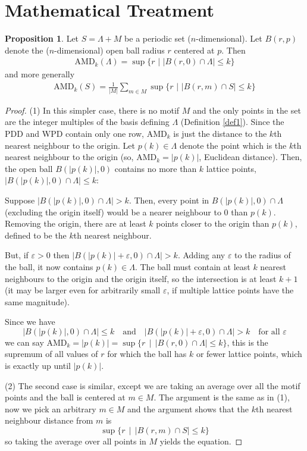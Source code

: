 \documentclass[11pt]{article}
\theoremstyle{definition}
\newtheorem{prop}{Proposition}
\begin{document}
\section{Mathematical Treatment}

\begin{prop}
Let $S=\Lambda+M$ be a periodic set ($n$-dimensional). Let $B(r,p)$ denote the ($n$-dimensional) open ball radius $r$ centered at $p$. Then
\begin{align}
\text{AMD}_k(\Lambda) = \sup \{r \,\,|\,\, |B(r,0) \cap \Lambda| \leq k\}
\end{align}
and more generally
\begin{align}
\text{AMD}_k(S) = \frac{1}{|M|}\sum_{m\in M}\sup \{r \,\,|\,\, |B(r,m) \cap S| \leq k\}
\end{align}
\end{prop}

\begin{proof}

(1) In this simpler case, there is no motif $M$ and the only points in the set are the integer multiples of the basis defining $\Lambda$ (Definition \ref{def1}). Since the PDD and WPD contain only one row, AMD$_k$ is just the distance to the $k$th nearest neighbour to the origin. Let $p(k)\in\Lambda$ denote the point which is the $k$th nearest neighbour to the origin (so, AMD$_k = |p(k)|$, Euclidean distance). Then, the open ball $B(|p(k)|,0)$ contains no more than $k$ lattice points, $|B(|p(k)|,0)\cap \Lambda|\leq k$:

Suppose $|B(|p(k)|,0)\cap \Lambda|>k$. Then, every point in $B(|p(k)|,0)\cap \Lambda$ (excluding the origin itself) would be a nearer neighbour to $0$ than $p(k)$. Removing the origin, there are at least $k$ points closer to the origin than $p(k)$, defined to be the $k$th nearest neighbour.

But, if $\varepsilon>0$ then $|B(|p(k)|+\varepsilon,0)\cap \Lambda| > k$. Adding any $\varepsilon$ to the radius of the ball, it now contains $p(k)\in\Lambda$. The ball must contain at least $k$ nearest neighbours to the origin and the origin itself, so the intersection is at least $k+1$ (it may be larger even for arbitrarily small $\varepsilon$, if multiple lattice points have the same magnitude).

Since we have
\[
|B(|p(k)|,0)\cap \Lambda|\leq k \quad \text{and} \quad |B(|p(k)|+\varepsilon,0)\cap \Lambda| > k \quad \text{for all $\varepsilon$}
\]
we can say AMD$_k = |p(k)| = \sup \{r \,\mid \, |B(r,0)\cap \Lambda| \leq k\}$, this is the supremum of all values of $r$ for which the ball has $k$ or fewer lattice points, which is exactly up until $|p(k)|$.

\null 

(2) The second case is similar, except we are taking an average over all the motif points and the ball is centered at $m\in M$. The argument is the same as in (1), now we pick an arbitrary $m\in M$ and the argument shows that the $k$th nearest neighbour distance from $m$ is 
\[
\sup \{r \,\mid \, |B(r,m)\cap S| \leq k\}
\]
so taking the average over all points in $M$ yields the equation.
\end{proof}
\end{document}
